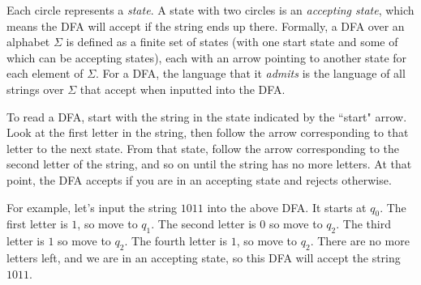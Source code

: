 \documentclass[11pt]{article}
\begin{document}
Each circle represents a \emph{state}. A state with two circles is an \emph{accepting state}, which means the DFA will accept if the string ends up there. Formally, a DFA over an alphabet $\Sigma$ is defined as a finite set of states (with one start state and some of which can be accepting states), each with an arrow pointing to another state for each element of $\Sigma$. For a DFA, the language that it \emph{admits} is the language of all strings over $\Sigma$ that accept when inputted into the DFA.

To read a DFA, start with the string in the state indicated by the ``start" arrow. Look at the first letter in the string, then follow the arrow corresponding to that letter to the next state. From that state, follow the arrow corresponding to the second letter of the string, and so on until the string has no more letters. At that point, the DFA accepts if you are in an accepting state and rejects otherwise.

For example, let's input the string $1011$ into the above DFA. It starts at $q_0$. The first letter is $1$, so move to $q_1$. The second letter is $0$ so move to $q_2$. The third letter is $1$ so move to $q_2$. The fourth letter is $1$, so move to $q_2$. There are no more letters left, and we are in an accepting state, so this DFA will accept the string $1011$.
\end{document}
